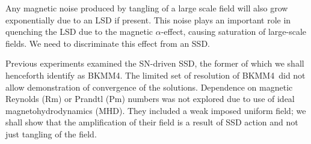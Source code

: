 \documentclass[preprint2]{aastex63}
\newcommand\BKM{{\sf BKMM4}}
\newcommand{\fg}[1]{\textcolor{midgreen}{#1}}
\begin{document}
 Any magnetic noise produced by tangling \fg{of a large scale field}
 will also grow exponentially due to an LSD if present.
 This noise plays an important role in quenching the LSD due to the magnetic
 $\alpha$-effect, causing saturation of large-scale fields.
 We need to discriminate this effect from an SSD.   

 Previous experiments \citep[e.g.,][]{BKMM04,BalKim05,MacLow:2005}
 examined the SN-driven SSD\fg{, the former of which we shall henceforth
 identify as \BKM}.
 \fg{The limited set of resolution \fg{of \BKM\ }did not allow
 demonstration of convergence of the solutions.
 Dependence on magnetic Reynolds (Rm) or Prandtl (Pm) numbers was not
 explored due to use of ideal magnetohydrodynamics (MHD).}
 They included a weak imposed uniform field; we shall show
 that the amplification of their field is a result
 of SSD action and not just tangling of the field.
\end{document}
